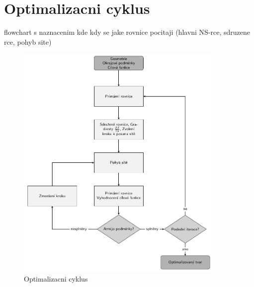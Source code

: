 \section{Optimalizacni cyklus}

flowchart s naznacenim kde kdy se jake rovnice pocitaji (hlavni NS-rce, sdruzene rce, pohyb site)

\begin{figure}
\includegraphics[width=0.9\textwidth]{./img/flowchart/optimalizacni_cyklus.pdf}
\caption{Optimalizacni cyklus}
\label{fig:flowchart_opt_cyklus}
\end{figure}

